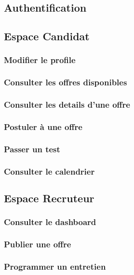 \subsection{Authentification}

\subsection{Espace Candidat}
\subsubsection{Modifier le profile}

\subsubsection{Consulter les offres disponibles}

\subsubsection{Consulter les details d'une offre}


\subsubsection{Postuler à une offre}


\subsubsection{Passer un test}

\subsubsection{Consulter le calendrier}


\subsection{Espace Recruteur}
\subsubsection{Consulter le dashboard}

\subsubsection{Publier une offre}

\subsubsection{Programmer un entretien}


